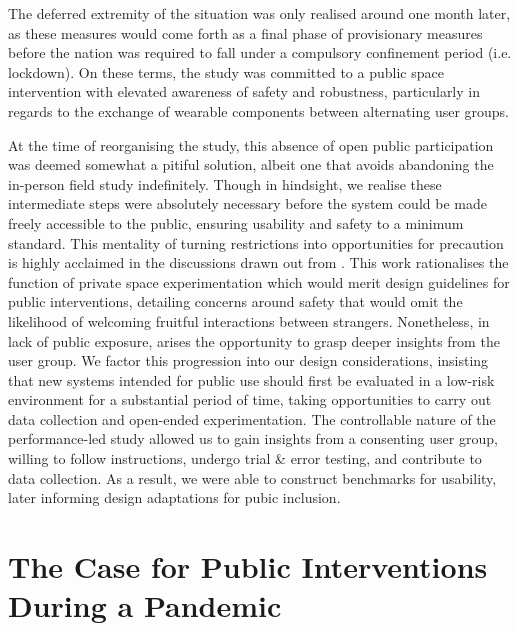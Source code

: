 The deferred extremity of the situation was only realised around one month later, as these measures would come forth as a final phase of provisionary measures before the nation was required to fall under a compulsory confinement period (i.e. lockdown). On these terms, the study was committed to a public space intervention with elevated awareness of safety and robustness, particularly in regards to the exchange of wearable components between alternating user groups.

At the time of reorganising the study, this absence of open public participation was deemed somewhat a pitiful solution, albeit one that avoids abandoning the in-person field study indefinitely. Though in hindsight, we realise these intermediate steps were absolutely necessary before the system could be made freely accessible to the public, ensuring usability and safety to a minimum standard. This mentality of turning restrictions into opportunities for precaution is highly acclaimed in the discussions drawn out from \citeauthor{howell_life-affirming_2019} \cite{howell_life-affirming_2019}. This work rationalises the function of private space experimentation which would merit design guidelines for public interventions, detailing concerns around safety that would omit the likelihood of welcoming fruitful interactions between strangers. Nonetheless, in lack of public exposure, arises the opportunity to grasp deeper insights from the user group. We factor this progression into our design considerations, insisting that new systems intended for public use should first be evaluated in a low-risk environment for a substantial period of time, taking opportunities to carry out data collection and open-ended experimentation. The controllable nature of the performance-led study allowed us to gain insights from a consenting user group, willing to follow instructions, undergo trial \& error testing, and contribute to data collection. As a result, we were able to construct benchmarks for usability, later informing design adaptations for pubic inclusion.

\section{The Case for Public Interventions During a Pandemic}
\label{sec:public_adaptation}

